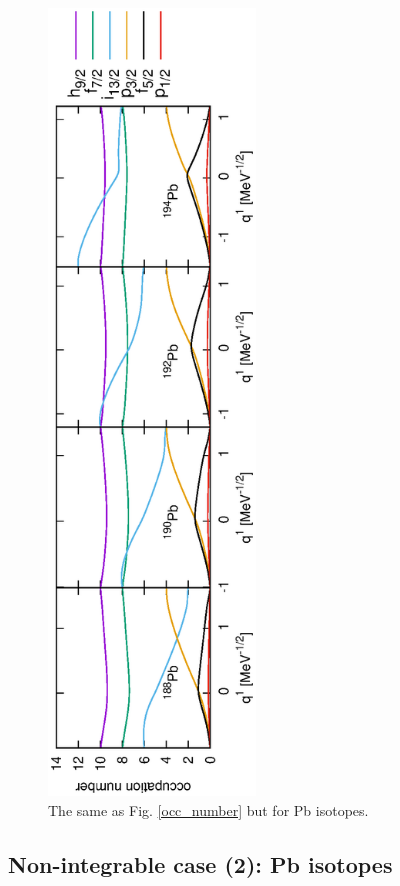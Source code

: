 \documentclass[%
superscriptaddress,
showpacs,
nofootinbib,
amsmath,amssymb,
aps,
prc,
twocolumn,
floatfix ]%
{revtex4-1}
\begin{document}
\begin{figure}[tb]
 \begin{center}
  \includegraphics[width=55mm,angle=-90]{Pbocc_number.eps}
 \end{center}
	\caption{The same as Fig. \ref{occ_number} but for Pb isotopes.
}
 \label{Pb_occ_number}
\end{figure}
\subsection{Non-integrable case (2): Pb isotopes}
\label{sec:Pb_isotopes}
\end{document}
